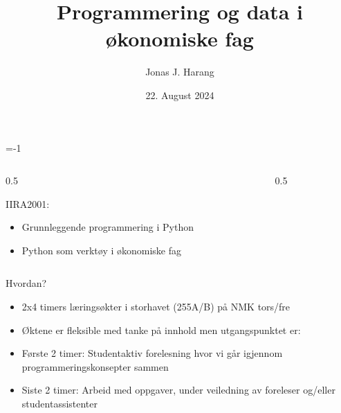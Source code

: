 \documentclass[aspectratio=169]{beamer}
\title[rl]{Programmering og data i økonomiske fag}
\date{22. August 2024}
\author{Jonas J. Harang}
\makeatletter
\newcommand{\SetSectionNumber}[1]{%
\beamer@tocsectionnumber=\numexpr#1-1}
\makeatother
\begin{document}
\SetSectionNumber{2}
%
\begin{frame}
   \maketitle
\end{frame}

\begin{frame}{}
  \begin{columns}
    \begin{column}{0.5\textwidth}
      \begin{block}{IIRA2001:}
        \begin{itemize}
          \item {Grunnleggende programmering i Python}
          \item {Python som verktøy i økonomiske fag}
        \end{itemize}
      \end{block}
    \end{column}
    \begin{column}{0.5\textwidth}
    \end{column}
  \end{columns}
\end{frame}

\begin{frame}{Hvordan?}
  \begin{itemize}
    \item {2x4 timers læringsøkter i storhavet (255A/B) på NMK tors/fre}
    \item {Øktene er fleksible med tanke på innhold men utgangspunktet er:}
        \item {Første 2 timer: Studentaktiv forelesning hvor vi går igjennom programmeringskonsepter sammen}
        \item {Siste 2 timer: Arbeid med oppgaver, under veiledning av foreleser og/eller studentassistenter}
  \end{itemize}
\end{frame}
\end{document}
